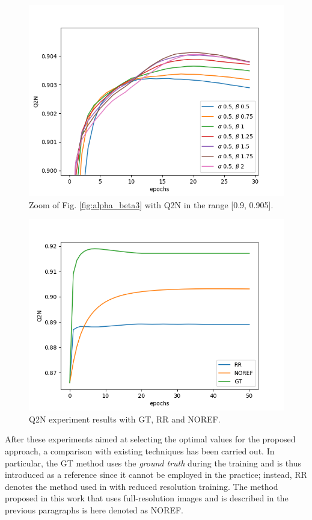 \documentclass[12pt]{report}
\begin{document}
\begin{figure}
    \centering
    \includegraphics[scale=.7]{alpha_beta4.png}
    \caption{Zoom of Fig. \ref{fig:alpha_beta3} with Q2N in the range [0.9, 0.905].}
    \label{fig:alpha_beta4}
\end{figure}

\begin{figure}[t]
    \centering
    \includegraphics[scale=.7]{toulouse_gt_rr_noref.png}
    \caption{Q2N experiment results with GT, RR and NOREF.}
    \label{fig:gt_rr_noref}
\end{figure}

After these experiments aimed at selecting the optimal values for the proposed approach, a comparison with existing techniques has been carried out.
In particular, the GT method uses the \textit{ground truth} during the training and is thus introduced as a reference since it cannot be employed in the practice;
instead, RR denotes the method used in \cite{pnn} with reduced resolution training. 
The method proposed in this work that uses full-resolution images and is described in the previous paragraphs is here denoted as NOREF.
\end{document}

